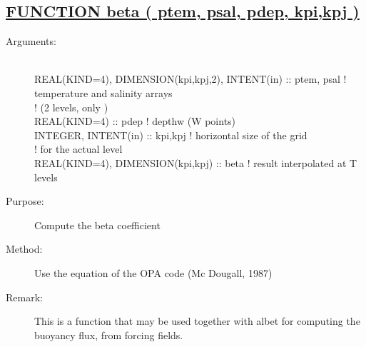 \documentclass[a4paper,11pt]{article}
\begin{document}
\subsection*{\underline{FUNCTION beta ( ptem, psal, pdep, kpi,kpj )}}
\begin{description}
\item[Arguments:] \ \\
       REAL(KIND=4), DIMENSION(kpi,kpj,2), INTENT(in) :: ptem, psal ! temperature and salinity arrays \\
                                                                    ! (2 levels, only ) \\
       REAL(KIND=4)                                   :: pdep       ! depthw (W points) \\
       INTEGER, INTENT(in)    :: kpi,kpj                            ! horizontal size of the grid \\
                                                                    ! for the actual level \\
       REAL(KIND=4), DIMENSION(kpi,kpj) :: beta                     ! result  interpolated at T levels

\item[Purpose:]  Compute the beta coefficient
\item[Method:] Use the equation of the OPA code (Mc Dougall, 1987)
\item[Remark:] This is a function that may be used together with albet for computing the buoyancy flux, from forcing fields.
\end{description}

\newpage


\tableofcontents
\printindex
\end{document}

